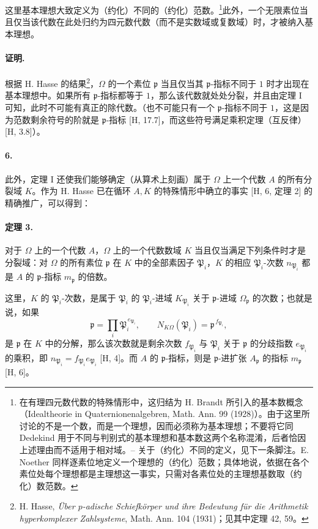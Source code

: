这里基本理想大致定义为（约化）不同的（约化）范数。\footnote{在有理四元数代数的特殊情形中，这归结为 H. Brandt 所引入的\glqq{}基本数\grqq{}概念（Idealtheorie in Quaternionenalgebren, Math. Ann. 99 (1928)）。由于这里所讨论的不是一个数，而是一个理想，因而必须称为\glqq{}基本理想\grqq{}；不要将它同 Dedekind 用于不同与判别式的基本理想和基本数这两个名称混淆，后者恰因上述理由而不适用于相对域。-- 关于（约化）不同的定义，见下一条脚注。E. Noether 同样\glqq{}逐素位地\grqq{}定义一个理想的（约化）范数；具体地说，依据在各个素位处每个理想都是主理想这一事实，只需对各素位处的主理想基数取（约化）数范数。}此外，一个无限素位当且仅当该代数在此处归约为四元数代数（而不是实数域或复数域）时，才被纳入基本理想。

\paragraph{证明.}
根据 H. Hasse 的结果\footnote{\label{fn:p38-hasse-padisch}H. Hasse, \emph{Über \(p\)-adische Schiefkörper und ihre Bedeutung für die Arithmetik hyperkomplexer Zahlsysteme}, Math. Ann. 104 (1931)；见其中定理 42, 59。}，\(\Omega\) 的一个素位 \(\mathfrak p\) 当且仅当其 \(\mathfrak p\)-指标不同于 \(1\) 时才出现在基本理想中。如果所有 \(\mathfrak p\)-指标都等于 \(1\)，那么该代数就处处分裂，并且由定理 I 可知，此时不可能有真正的除代数。（也不可能只有一个 \(\mathfrak p\)-指标不同于 \(1\)，这是因为范数剩余符号的阶就是 \(\mathfrak p\)-指标 [H, 17.7]，而这些符号满足乘积定理（互反律）[H, 3.8]）。

\paragraph{6.}
此外，定理 I 还使我们能够确定（从算术上刻画）属于 \(\Omega\) 上一个代数 \(A\) 的所有分裂域 \(K\)。作为 H. Hasse 已在循环 \(A,K\) 的特殊情形中确立的事实 [H, 6, 定理 2] 的精确推广，可以得到：

\paragraph{定理 3.}
对于 \(\Omega\) 上的一个代数 \(A\)，\(\Omega\) 上的一个代数数域 \(K\) 当且仅当满足下列条件时才是分裂域：对 \(\Omega\) 的所有素位 \(\mathfrak p\) 在 \(K\) 中的全部素因子 \(\mathfrak P_i\)，\(K\) 的相应 \(\mathfrak P_i\)-次数 \(n_{\mathfrak P_i}\) 都是 \(A\) 的 \(\mathfrak p\)-指标 \(m_{\mathfrak p}\) 的倍数。

这里，\(K\) 的 \(\mathfrak P_i\)-次数，是属于 \(\mathfrak P_i\) 的 \(\mathfrak P_i\)-进域 \(K_{\mathfrak P_i}\) 关于 \(\mathfrak p\)-进域 \(\Omega_{\mathfrak p}\) 的次数；也就是说，如果
\[
\mathfrak p=\prod_i \mathfrak P_i^{\,e_{\mathfrak P_i}},
        \qquad N_{K\Omega}(\mathfrak P_i)=\mathfrak p^{\,f_{\mathfrak P_i}},
\]
是 \(\mathfrak p\) 在 \(K\) 中的分解，那么该次数就是剩余次数 \(f_{\mathfrak P_i}\) 与 \(\mathfrak P_i\) 关于 \(\mathfrak p\) 的分歧指数 \(e_{\mathfrak P_i}\) 的乘积，即 \(n_{\mathfrak P_i}=f_{\mathfrak P_i}e_{\mathfrak P_i}\) [H, 4]。而 \(A\) 的 \(\mathfrak p\)-指标，则是 \(\mathfrak p\)-进扩张 \(A_{\mathfrak p}\) 的指标 \(m_{\mathfrak p}\) [H, 6]。

